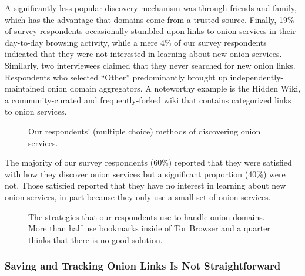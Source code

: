 A significantly less popular discovery mechanism was through friends and family,
which has the advantage that domains come from a trusted source.    Finally, 19\% of survey respondents occasionally stumbled upon links to
onion services in their day-to-day browsing activity, while a mere 4\% of our
survey respondents indicated that they were not interested in learning about new
onion services.  Similarly, two interviewees claimed that they never searched
for new onion links.  Respondents who selected ``Other'' predominantly brought
up independently-maintained onion domain aggregators.  A noteworthy example is
the Hidden Wiki, a community-curated and frequently-forked wiki that contains
categorized links to onion services.

\begin{figure}[t]
    \centering
    
    \caption{Our respondents' (multiple choice) methods of discovering onion
    services.}
    \label{fig:onion-discovery}
\end{figure}

The majority of our survey respondents (60\%) reported that they were satisfied
with how they discover onion services but a significant proportion (40\%) were
not. Those satisfied reported that they have no interest in learning about new
onion services, in part because they only use a small set of onion services.

\begin{figure}[t]
    \centering
    
    \caption{The strategies that our respondents use to handle onion domains.
    More than half use bookmarks inside of Tor Browser and a quarter thinks that
    there is no good solution.}
    \label{fig:onion-domain-mgmt}
\end{figure}

\subsubsection{Saving and Tracking Onion Links Is Not Straightforward}


